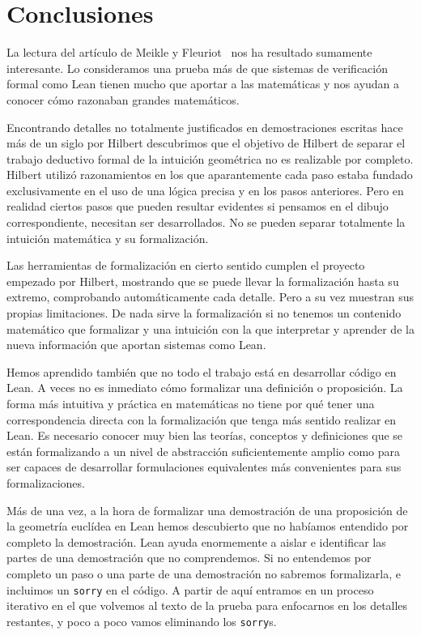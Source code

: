 \section{Conclusiones}

La lectura del artículo de Meikle y
Fleuriot~\cite{meikleFormalizingHilbertGrundlagen2003} nos ha resultado
sumamente interesante. Lo consideramos una prueba más de que sistemas de
verificación formal como Lean tienen mucho que aportar a las matemáticas
y nos ayudan a conocer cómo razonaban grandes matemáticos.

Encontrando detalles no totalmente justificados en demostraciones escritas hace
más de un siglo por Hilbert descubrimos que el objetivo de Hilbert de separar el
trabajo deductivo formal de la intuición geométrica no es realizable por
completo. Hilbert utilizó razonamientos en los que aparantemente cada paso
estaba fundado exclusivamente en el uso de una lógica precisa y en los pasos
anteriores. Pero en realidad ciertos pasos que pueden resultar
evidentes si pensamos en el dibujo correspondiente, necesitan ser desarrollados.
No se pueden separar totalmente la intuición matemática y su formalización.

Las herramientas de formalización en cierto sentido cumplen el proyecto
empezado por Hilbert, mostrando que se puede llevar la
formalización hasta su extremo, comprobando automáticamente cada detalle. Pero a
su vez muestran sus propias limitaciones. De nada sirve la formalización si no
tenemos un contenido matemático que formalizar y una intuición con la que
interpretar y aprender de la nueva información que aportan sistemas como Lean.

Hemos aprendido también que no todo el trabajo está en desarrollar código en
Lean. A veces no es inmediato cómo formalizar una definición o proposición. La
forma más intuitiva y práctica en matemáticas no tiene por qué tener una
correspondencia directa con la formalización que tenga más sentido realizar en
Lean. Es necesario conocer muy bien las teorías, conceptos y definiciones que
se están formalizando a un nivel de abstracción suficientemente amplio como
para ser capaces de desarrollar formulaciones equivalentes más convenientes para
sus formalizaciones.

Más de una vez, a la hora de formalizar una demostración de una proposición de
la geometría euclídea en Lean hemos descubierto que no habíamos
entendido por completo la demostración. Lean ayuda enormemente a aislar
e identificar las partes de una demostración que no comprendemos. Si no
entendemos por completo un paso o una parte de una demostración no sabremos
formalizarla, e incluimos un \lstinline{sorry} en el código. A partir de aquí
entramos en un proceso iterativo en el que volvemos al texto de la prueba para
enfocarnos en los detalles restantes, y poco a poco vamos eliminando los
\lstinline{sorry}s.


